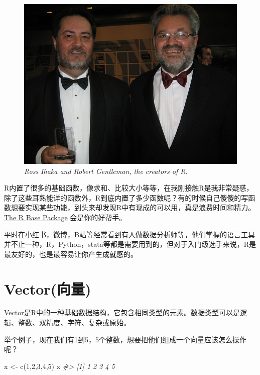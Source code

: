 \documentclass[
]{book}
\newenvironment{Shaded}{\begin{snugshade}}{\end{snugshade}}
\newcommand{\CommentTok}[1]{\textcolor[rgb]{0.56,0.35,0.01}{\textit{#1}}}
\newcommand{\DecValTok}[1]{\textcolor[rgb]{0.00,0.00,0.81}{#1}}
\newcommand{\FunctionTok}[1]{\textcolor[rgb]{0.00,0.00,0.00}{#1}}
\newcommand{\NormalTok}[1]{#1}
\newcommand{\OtherTok}[1]{\textcolor[rgb]{0.56,0.35,0.01}{#1}}
\begin{document}
\begin{figure}
\centering
\includegraphics{images/creators.jpg}
\caption{\emph{Ross Ihaka and Robert Gentleman, the creators of R.}}
\end{figure}

R内置了很多的基础函数，像求和、比较大小等等，在我刚接触R是我非常疑惑，除了这些耳熟能详的函数外，R到底内置了多少函数呢？有的时候自己傻傻的写函数想要实现某些功能，到头来却发现R中有现成的可以用，真是浪费时间和精力。\href{https://stat.ethz.ch/R-manual/R-devel/library/base/html/00Index.html}{The R Base Package} 会是你的好帮手。

平时在小红书，微博，B站等经常看到有人做数据分析师等，他们掌握的语言工具并不止一种，R，Python，stata等都是需要用到的，但对于入门级选手来说，R是最友好的，也是最容易让你产生成就感的。

\hypertarget{vectorux5411ux91cf}{%
\section{Vector(向量)}\label{vectorux5411ux91cf}}

Vector是R中的一种基础数据结构，它包含相同类型的元素。数据类型可以是逻辑、整数、双精度、字符、复杂或原始。

举个例子，现在我们有1到5，5个整数，想要把他们组成一个向量应该怎么操作呢？

\begin{Shaded}
\begin{Highlighting}[]
\NormalTok{x }\OtherTok{\textless{}{-}} \FunctionTok{c}\NormalTok{(}\DecValTok{1}\NormalTok{,}\DecValTok{2}\NormalTok{,}\DecValTok{3}\NormalTok{,}\DecValTok{4}\NormalTok{,}\DecValTok{5}\NormalTok{)}
\NormalTok{x}
\CommentTok{\#\textgreater{} [1] 1 2 3 4 5}
\end{Highlighting}
\end{Shaded}
\end{document}
